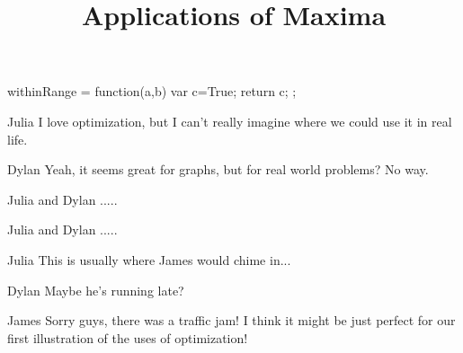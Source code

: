 \documentclass{ximera}
\title{Applications of Maxima}
\begin{document}
\maketitle
\begin{javascript}
withinRange = function(a,b) {
    var c=True;
    return c;
  };
\end{javascript}
\begin{dialogue}
\item[Julia] I love optimization, but I can't really imagine where we could use it in real life.
\item[Dylan] Yeah, it seems great for graphs, but for real world problems? No way.
\item[Julia and Dylan] .....
\item[Julia and Dylan] .....
\item[Julia] This is usually where James would chime in...
\item[Dylan] Maybe he's running late?
\item[James] Sorry guys, there was a traffic jam! I think it might be just perfect for our first illustration of the uses of optimization!
\end{dialogue}
\end{document}
